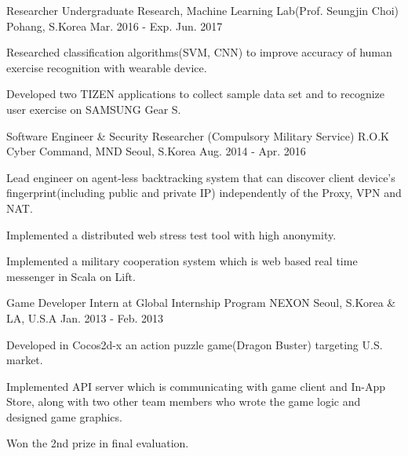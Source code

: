 \begin{cventries}
  \cventry
  {Researcher} %
  {Undergraduate Research, Machine Learning Lab(Prof. Seungjin Choi)} %
  {Pohang, S.Korea} %
  {Mar. 2016 - Exp. Jun. 2017} %
  {
    \begin{cvitems} %
    \item {Researched classification algorithms(SVM, CNN) to improve accuracy of human exercise recognition
      with wearable device.}
    \item {Developed two TIZEN applications to collect sample data set and to recognize user exercise on
      SAMSUNG Gear S.}
    \end{cvitems}
  }

  \cventry
  {Software Engineer \& Security Researcher (Compulsory Military Service)} %
  {R.O.K Cyber Command, MND} %
  {Seoul, S.Korea} %
  {Aug. 2014 - Apr. 2016} %
  {
    \begin{cvitems} %
    \item {Lead engineer on agent-less backtracking system that can discover client device's
      fingerprint(including public and private IP) independently of the Proxy, VPN and NAT.}
    \item {Implemented a distributed web stress test tool with high anonymity.}
    \item {Implemented a military cooperation system which is web based real time messenger in Scala on Lift.}
    \end{cvitems}
  }

  \cventry
  {Game Developer Intern at Global Internship Program} %
  {NEXON} %
  {Seoul, S.Korea \& LA, U.S.A} %
  {Jan. 2013 - Feb. 2013} %
  {
    \begin{cvitems} %
    \item {Developed in Cocos2d-x an action puzzle game(Dragon Buster) targeting U.S. market.}
    \item {Implemented API server which is communicating with game client and In-App Store, along with two
      other team members who wrote the game logic and designed game graphics.}
    \item {Won the 2nd prize in final evaluation.}
    \end{cvitems}
  }


\end{cventries}
